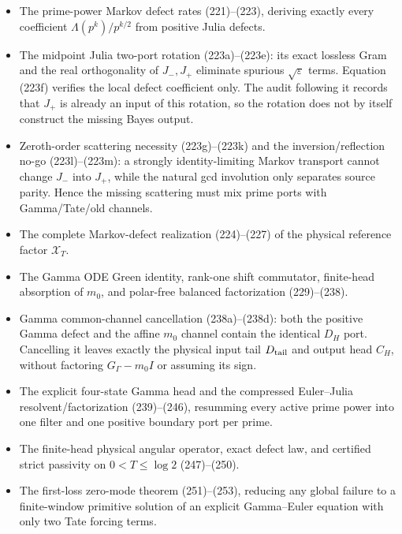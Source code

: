 \documentclass[11pt]{article}
\begin{document}
\begin{itemize}
      defect is an ordinary positive Hilbert object already at $t=1$.
      The Bayes pullback criterion (220j) isolates the remaining physical
      whitening/cutoff/Tate intertwining without defining a square from G.
\item The prime-power Markov defect rates (221)--(223), deriving exactly
      every coefficient $\Lambda(p^k)/p^{k/2}$ from positive Julia defects.
\item The midpoint Julia two-port rotation (223a)--(223e): its exact lossless
      Gram and the real orthogonality of $J_-,J_+$ eliminate spurious
      $\sqrt\varepsilon$ terms.  Equation (223f) verifies the local defect
      coefficient only.  The audit following it records that $J_+$ is already
      an input of this rotation, so the rotation does not by itself construct
      the missing Bayes output.
\item Zeroth-order scattering necessity (223g)--(223k) and the
      inversion/reflection no-go (223l)--(223m): a strongly identity-limiting
      Markov transport cannot change $J_-$ into $J_+$, while the natural gcd
      involution only separates source parity.  Hence the missing scattering
      must mix prime ports with Gamma/Tate/old channels.
\item The complete Markov-defect realization (224)--(227) of the physical
      reference factor $\mathcal X_T$.
\item The Gamma ODE Green identity, rank-one shift commutator, finite-head
      absorption of $m_0$, and polar-free balanced factorization
      (229)--(238).
\item Gamma common-channel cancellation (238a)--(238d): both the positive
      Gamma defect and the affine $m_0$ channel contain the identical
      $D_H$ port.  Cancelling it leaves exactly the physical input tail
      $D_{\rm tail}$ and output head $C_H$, without factoring
      $G_\Gamma-m_0I$ or assuming its sign.
\item The explicit four-state Gamma head and the compressed Euler--Julia
      resolvent/factorization (239)--(246), resumming every active prime power
      into one filter and one positive boundary port per prime.
\item The finite-head physical angular operator, exact defect law, and
      certified strict passivity on $0<T\le\log2$ (247)--(250).
\item The first-loss zero-mode theorem (251)--(253), reducing any global
      failure to a finite-window primitive solution of an explicit
      Gamma--Euler equation with only two Tate forcing terms.

\end{itemize}
\end{document}
